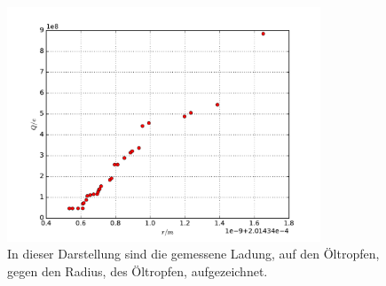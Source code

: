 \begin{figure}
  \centering
  \includegraphics[height=7cm]{plots/milliplot.pdf}
  \caption{In dieser Darstellung sind die gemessene Ladung,
  auf den Öltropfen, gegen den Radius, des Öltropfen, aufgezeichnet.}
  \label{fig:eQ}
\end{figure}






















%
